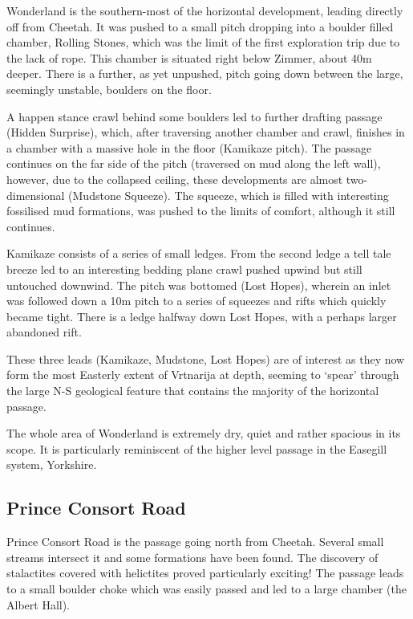 Wonderland is the southern-most of the horizontal development, leading
directly off from Cheetah. It was pushed to a small pitch dropping into
a boulder filled chamber, Rolling Stones, which was the limit of the
first exploration trip due to the lack of rope. This chamber is situated
right below Zimmer, about 40m deeper. There is a further, as yet
unpushed, pitch going down between the large, seemingly unstable,
boulders on the floor.

A happen stance crawl behind some boulders led to further drafting
passage (Hidden Surprise), which, after traversing another chamber and
crawl, finishes in a chamber with a massive hole in the floor (Kamikaze
pitch). The passage continues on the far side of the pitch (traversed on
mud along the left wall), however, due to the collapsed ceiling, these
developments are almost two-dimensional (Mudstone Squeeze). The squeeze,
which is filled with interesting fossilised mud formations, was pushed
to the limits of comfort, although it still continues.

Kamikaze consists of a series of small ledges. From the second ledge a
tell tale breeze led to an interesting bedding plane crawl pushed upwind
but still untouched downwind. The pitch was bottomed (Lost Hopes),
wherein an inlet was followed down a 10m pitch to a series of squeezes
and rifts which quickly became tight. There is a ledge halfway down Lost
Hopes, with a perhaps larger abandoned rift.

These three leads (Kamikaze, Mudstone, Lost Hopes) are of interest as
they now form the most Easterly extent of Vrtnarija at depth, seeming to
`spear' through the large N-S geological feature that contains the
majority of the horizontal passage.

The whole area of Wonderland is extremely dry, quiet and rather spacious
in its scope. It is particularly reminiscent of the higher level passage
in the Easegill system, Yorkshire.

\hypertarget{prince-consort-road}{%
\subsection{Prince Consort Road}\label{prince-consort-road}}

Prince Consort Road is the passage going north from Cheetah. Several
small streams intersect it and some formations have been found. The
discovery of stalactites covered with helictites proved particularly
exciting! The passage leads to a small boulder choke which was easily
passed and led to a large chamber (the Albert Hall).

